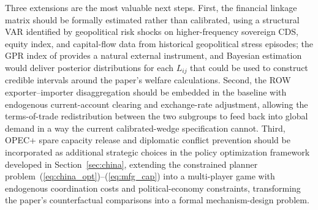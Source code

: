 \documentclass[12pt]{article}
\begin{document}
Three extensions are the most valuable next steps. First, the financial linkage matrix should be formally estimated rather than calibrated, using a structural VAR identified by geopolitical risk shocks on higher-frequency sovereign CDS, equity index, and capital-flow data from historical geopolitical stress episodes; the GPR index of \citet{caldara2022measuring} provides a natural external instrument, and Bayesian estimation would deliver posterior distributions for each $L_{ij}$ that could be used to construct credible intervals around the paper's welfare calculations. Second, the ROW exporter--importer disaggregation should be embedded in the baseline with endogenous current-account clearing and exchange-rate adjustment, allowing the terms-of-trade redistribution between the two subgroups to feed back into global demand in a way the current calibrated-wedge specification cannot. Third, OPEC+ spare capacity release and diplomatic conflict prevention should be incorporated as additional strategic choices in the policy optimization framework developed in Section~\ref{sec:china}, extending the constrained planner problem~(\ref{eq:china_opt})--(\ref{eq:mfg_cap}) into a multi-player game with endogenous coordination costs and political-economy constraints, transforming the paper's counterfactual comparisons into a formal mechanism-design problem.


\newpage

\end{document}
